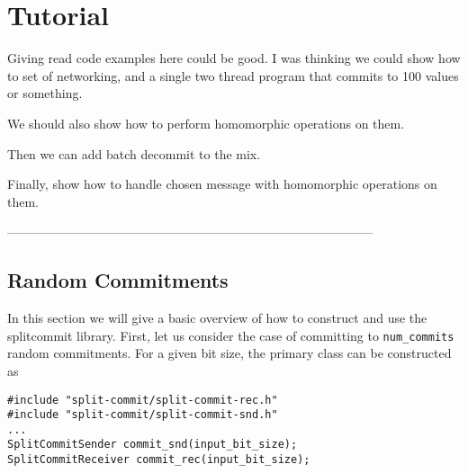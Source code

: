 \section{Tutorial}

Giving read code examples here could be good. I was thinking we could show how to set of networking, and a single two thread program that commits to 100 values or something.

We should also show how to perform homomorphic operations on them.

Then we can add batch decommit to the mix.

Finally, show how to handle chosen message with homomorphic operations on them.

---------------------------------------------------------------------------------------


\subsection{Random Commitments}
In this section we will give a basic overview of how to construct and use the splitcommit library. First, let us consider the case of committing to \texttt{num\_commits} random commitments. For a given bit size, the primary class can be constructed as
\begin{lstlisting}
#include "split-commit/split-commit-rec.h"
#include "split-commit/split-commit-snd.h"
...
SplitCommitSender commit_snd(input_bit_size);
SplitCommitReceiver commit_rec(input_bit_size);
\end{lstlisting}

